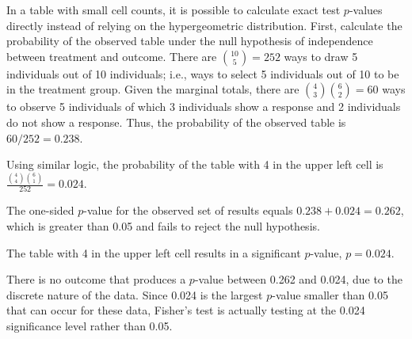 \begin{examplewrap}
\begin{nexample}
		In a table with small cell counts, it is possible to calculate exact test $p$-values directly instead of relying on the hypergeometric distribution. First, calculate the probability of the observed table under the null hypothesis of independence between treatment and outcome. There are ${10 \choose 5} = 252$ ways to draw 5 individuals out of 10 individuals; i.e., ways to select 5 individuals out of 10 to be in the treatment group. Given the marginal totals, there are  ${4 \choose 3} {6 \choose 2} = 60$ ways to observe 5 individuals of which 3 individuals show a response and 2 individuals do not show a response. Thus, the probability of the observed table is $60/252 = 0.238$.

		Using similar logic, the probability of the table with 4 in the upper left cell is $\frac{{4 \choose 4} {6 \choose 1}}{252} = 0.024$.

		The one-sided $p$-value for the observed set of results equals $0.238 + 0.024 = 0.262$, which is greater than 0.05 and fails to reject the null hypothesis.

		The table with 4 in the upper left cell results in a significant $p$-value, $p = 0.024$.

		There is no outcome that produces a $p$-value between 0.262 and 0.024, due to the discrete nature of the data. Since 0.024 is the largest $p$-value smaller than 0.05 that can occur for these data, Fisher's test is actually testing at the 0.024 significance level rather than 0.05.
	\end{nexample}
\end{examplewrap}


